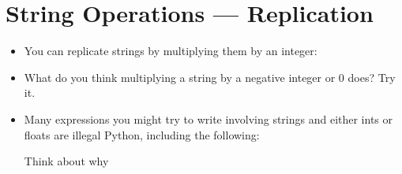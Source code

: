 \documentclass[letterpaper,10pt,english]{sphinxmanual}
\begin{document}
\section{String Operations — Replication}
\label{\detokenize{lecture_notes/lec03_strings:string-operations-replication}}\begin{itemize}
\item {} 
You can replicate strings by multiplying them by an integer:

%
\begin{sphinxVerbatim}[commandchars=\\\{\}]
  
  
\end{sphinxVerbatim}

\item {} 
What do you think multiplying a string by a negative integer or 0
does? Try it.

\item {} 
Many expressions you might try to write involving strings and either
ints or floats are illegal Python, including the following:

%
\begin{sphinxVerbatim}[commandchars=\\\{\}]
  
  
\end{sphinxVerbatim}

Think about why

\end{itemize}
\end{document}
